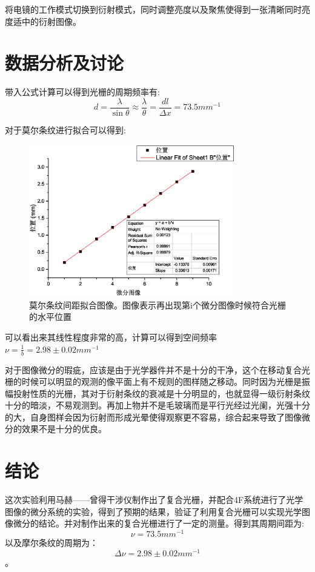\documentclass[aps,pre,12pt,preprint,onecolumn,showpacs,showkeys,UTF8]{revtex4-1}
\begin{document}
将电镜的工作模式切换到衍射模式，同时调整亮度以及聚焦使得到一张清晰同时亮度适中的衍射图像。



\section{数据分析及讨论}

带入公式计算可以得到光栅的周期频率有:
$$d=\frac{\lambda}{\sin{\theta}}\approx\frac{\lambda}{\theta}=\frac{dl}{\Delta x}=73.5 mm^{-1}$$

对于莫尔条纹进行拟合可以得到:

\begin{figure}[h]
	\begin{center}
		\includegraphics[width=0.8\textwidth]{pic6.eps}
		\caption{\label{fig:exp3}莫尔条纹间距拟合图像。图像表示再出现第i个微分图像时候符合光栅的水平位置}
	\end{center}
\end{figure}
\newpage
可以看出来其线性程度非常的高，计算可以得到空间频率$\nu=\frac{1}{b}=2.98 \pm 0.02 mm^{-1}$

对于图像微分的瑕疵，应该是由于光学器件并不是十分的干净，这个在移动复合光栅的时候可以明显的观测的像平面上有不规则的图样随之移动。同时因为光栅是振幅投射性质的光栅，其对于衍射条纹的衰减是十分明显的，也就显得一级衍射条纹十分的暗淡，不易观测到。再加上物并不是毛玻璃而是平行光经过光阑，光强十分的大，自身图样会因为衍射而形成光晕使得观察更不容易，综合起来导致了图像微分的效果不是十分的优良。

\section{结论}

这次实验利用马赫——曾得干涉仪制作出了复合光栅，并配合4F系统进行了光学图像的微分系统的实验，得到了预期的结果，验证了利用复合光栅可以实现光学图像微分的结论。并对制作出来的复合光栅进行了一定的测量。得到其周期间距为:
$$\nu=73.5mm^{-1}$$
以及摩尔条纹的周期为：
$$\Delta\nu=2.98 \pm 0.02 mm^{-1}$$。
\end{document}
